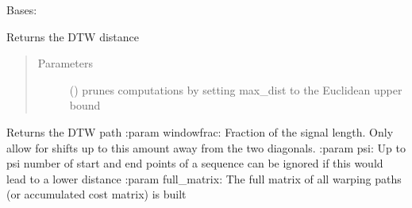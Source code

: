 \documentclass[letterpaper,10pt,english]{sphinxmanual}
\begin{document}
\begin{fulllineitems}
\label{\detokenize{modules/dtw_analysis:dtwhaclustering.dtw_analysis.dtw_signal_pairs}}
\sphinxAtStartPar
Bases: 

\begin{fulllineitems}
\label{\detokenize{modules/dtw_analysis:dtwhaclustering.dtw_analysis.dtw_signal_pairs.compute_distance}}
\sphinxAtStartPar
Returns the DTW distance
\begin{quote}\begin{description}
\item[{Parameters}] \leavevmode
\sphinxAtStartPar
{} () \textendash{} prunes computations by setting max\_dist to the Euclidean upper bound

\end{description}\end{quote}

\end{fulllineitems}


\begin{fulllineitems}
\label{\detokenize{modules/dtw_analysis:dtwhaclustering.dtw_analysis.dtw_signal_pairs.compute_warping_path}}
\sphinxAtStartPar
Returns the DTW path
:param windowfrac: Fraction of the signal length. Only allow for shifts up to this amount away from the two diagonals.
:param psi: Up to psi number of start and end points of a sequence can be ignored if this would lead to a lower distance
:param full\_matrix: The full matrix of all warping paths (or accumulated cost matrix) is built


\end{fulllineitems}
\end{fulllineitems}
\end{document}
